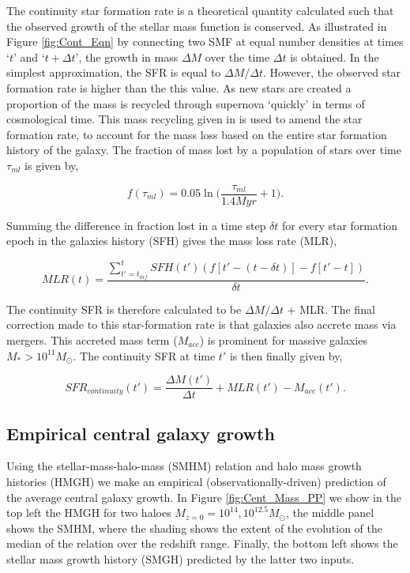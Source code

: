 The continuity star formation rate is a theoretical quantity calculated such that the observed growth of the stellar mass function is conserved. As illustrated in Figure \ref{fig:Cont_Eqn} by connecting two SMF at equal number densities at times `$t$' and `$t + \Delta t$', the growth in mass $\Delta M$ over the time $\Delta t$ is obtained. In the simplest approximation, the SFR is equal to $\Delta M / \Delta t$. However, the observed star formation rate is higher than the this value. As new stars are created a proportion of the mass is recycled through supernova `quickly' in terms of cosmological time. This mass recycling given in \citet{Moster2018Emerge10} is used to amend the star formation rate, to account for the mass loss based on the entire star formation history of the galaxy. The fraction of mass lost by a population of stars over time $\tau_{ml}$ is given by,

\begin{equation}
\label{eqn:f_ml}
f(\tau_{ml}) = 0.05 \ln \Big(\frac{\tau_{ml}}{1.4 Myr}+1\Big).
\end{equation}

Summing the difference in fraction lost in a time step $\delta t$ for every star formation epoch in the galaxies history (SFH) gives the mass loss rate (MLR), 

\begin{equation}
\label{eqn:MLR}
MLR(t) = \frac{ \sum_{t' = t_{inf}}^{t} SFH(t')(f[t' - (t-\delta t)]-f[t' - t]) }{\delta t}.
\end{equation}

The continuity SFR is therefore calculated to be $\Delta M / \Delta t$ + MLR. The final correction made to this star-formation rate is that galaxies also accrete mass via mergers. This accreted mass term ($M_{acc}$) is prominent for massive galaxies $M_* > 10^{11} M_{\odot}$. The continuity SFR at time $t'$ is then finally given by,

\begin{equation}
    SFR_{continuity}(t') = \frac{\Delta M(t')}{\Delta t} + MLR(t') - M_{acc}(t').
\end{equation}

\subsection{Empirical central galaxy growth}

Using the stellar-mass-halo-mass (SMHM) relation and halo mass growth histories (HMGH) we make an empirical (observationally-driven) prediction of the average central galaxy growth. In Figure \ref{fig:Cent_Mass_PP} we show in the top left the HMGH for two haloes $M_{z=0} = 10^{14}, 10^{12.5} M_{\odot}$, the middle panel shows the SMHM, where the shading shows the extent of the evolution of the median of the relation over the redshift range. Finally, the bottom left shows the stellar mass growth history (SMGH) predicted by the latter two inputs.

